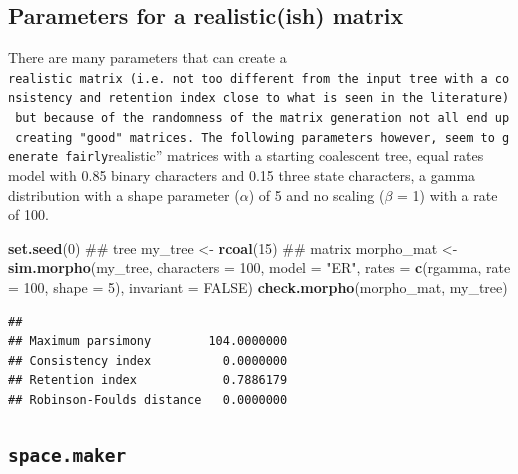 \documentclass[]{book}
\newenvironment{Shaded}{\begin{snugshade}}{\end{snugshade}}
\newcommand{\KeywordTok}[1]{\textcolor[rgb]{0.13,0.29,0.53}{\textbf{#1}}}
\newcommand{\DataTypeTok}[1]{\textcolor[rgb]{0.13,0.29,0.53}{#1}}
\newcommand{\DecValTok}[1]{\textcolor[rgb]{0.00,0.00,0.81}{#1}}
\newcommand{\StringTok}[1]{\textcolor[rgb]{0.31,0.60,0.02}{#1}}
\newcommand{\OtherTok}[1]{\textcolor[rgb]{0.56,0.35,0.01}{#1}}
\newcommand{\NormalTok}[1]{#1}
\theoremstyle{definition}
\theoremstyle{definition}
\theoremstyle{remark}
\begin{document}
\subsection{Parameters for a realistic(ish)
matrix}\label{parameters-for-a-realisticish-matrix}

There are many parameters that can create a
\texttt{realistic\textquotesingle{}\textquotesingle{}\ matrix\ (i.e.\ not\ too\ different\ from\ the\ input\ tree\ with\ a\ consistency\ and\ retention\ index\ close\ to\ what\ is\ seen\ in\ the\ literature)\ but\ because\ of\ the\ randomness\ of\ the\ matrix\ generation\ not\ all\ end\ up\ creating\ "good"\ matrices.\ The\ following\ parameters\ however,\ seem\ to\ generate\ fairly}realistic''
matrices with a starting coalescent tree, equal rates model with 0.85
binary characters and 0.15 three state characters, a gamma distribution
with a shape parameter (\(\alpha\)) of 5 and no scaling (\(\beta\) = 1)
with a rate of 100.

\begin{Shaded}
\begin{Highlighting}[]
\KeywordTok{set.seed}\NormalTok{(}\DecValTok{0}\NormalTok{)}
\NormalTok{## tree}
\NormalTok{my_tree <-}\StringTok{ }\KeywordTok{rcoal}\NormalTok{(}\DecValTok{15}\NormalTok{)}
\NormalTok{## matrix}
\NormalTok{morpho_mat <-}\StringTok{ }\KeywordTok{sim.morpho}\NormalTok{(my_tree, }\DataTypeTok{characters =} \DecValTok{100}\NormalTok{, }\DataTypeTok{model =} \StringTok{"ER"}\NormalTok{,}
    \DataTypeTok{rates =} \KeywordTok{c}\NormalTok{(rgamma, }\DataTypeTok{rate =} \DecValTok{100}\NormalTok{, }\DataTypeTok{shape =} \DecValTok{5}\NormalTok{), }\DataTypeTok{invariant =} \OtherTok{FALSE}\NormalTok{)}
\KeywordTok{check.morpho}\NormalTok{(morpho_mat, my_tree)}
\end{Highlighting}
\end{Shaded}

\begin{verbatim}
##                                     
## Maximum parsimony        104.0000000
## Consistency index          0.0000000
## Retention index            0.7886179
## Robinson-Foulds distance   0.0000000
\end{verbatim}

\hypertarget{space.maker}{\subsection{\texorpdfstring{\texttt{space.maker}}{space.maker}}\label{space.maker}}
\end{document}
